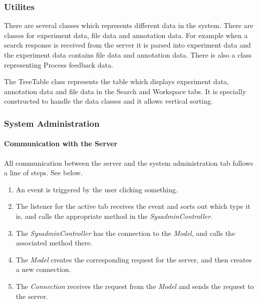 \subsubsection{Utilites}

There are several classes which represents different data in the system. There are classes for experiment data, file data and annotation data. For example when a search response is received from the server it is parsed into experiment data and the experiment data contains file data and annotation data. There is also a class representing Process feedback data.

The TreeTable class represents the table which displays experiment data, annotation data and file data in the Search and Workspace tabs. It is specially constructed to handle the data classes and it allows vertical sorting.

\subsubsection{System Administration}

\paragraph{Communication with the Server}
\label{Communication with the Server}

All communication between the server and the system administration tab follows a line of steps. See  below.

\begin{enumerate}

  \item An event is triggered by the user clicking something.
  \item The listener for the active tab receives the event and sorts out which type it is, and calls the appropriate method in the \textit{SysadminController}.
  \item The \textit{SysadminController} has the connection to the \textit{Model}, and calls the associated method there.
  \item The \textit{Model} creates the corresponding request for the server, and then creates a new connection.
  \item The \textit{Connection} receives the request from the \textit{Model} and sends the request to the server.


\end{enumerate}

